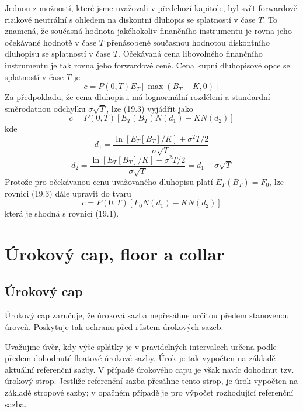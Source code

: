 \documentclass[a4paper]{book}
\begin{document}
Jednou z možností, které jsme uvažovali v předchozí kapitole, byl svět forwardově rizikově neutrální s ohledem na diskontní dluhopis se splatností v čase $T$. To znamená, že současná hodnota jakéhokoliv finančního instrumentu je rovna jeho očekávané hodnotě v čase $T$ přenásobené současnou hodnotou diskontního dluhopisu se splatností v čase $T$. Očekávaná cena libovolného finančního instrumentu je tak rovna jeho forwardové ceně. Cena kupní dluhopisové opce se splatností v čase $T$ je
\begin{equation}
c = P(0,T)E_T[\max(B_T - K, 0)]
\end{equation}
Za předpokladu, že cena dluhopisu má lognormální rozdělení a standardní směrodatnou odchylku $\sigma \sqrt{T}$, lze (19.3) vyjádřit jako
\begin{equation*}
c = P(0,T)[E_T(B_T)N(d_1)-KN(d_2)]
\end{equation*}
kde
\begin{equation*}
d_1 = \frac{\ln[E_T[B_T]/K]+\sigma^2T/2}{\sigma \sqrt{T}}
\end{equation*}
\begin{equation*}
d_2 = \frac{\ln[E_T[B_T]/K]-\sigma^2T/2}{\sigma \sqrt{T}} = d_1 - \sigma \sqrt{T}
\end{equation*}
Protože pro očekávanou cenu uvažovaného dluhopisu platí $E_T(B_T) = F_0$, lze rovnici (19.3) dále upravit do tvaru
\begin{equation*}
c = P(0,T)[F_0N(d_1)-KN(d_2)]
\end{equation*}
která je shodná s rovnicí (19.1).

\section{Úrokový cap, floor a collar}

\subsection{Úrokový cap}

Úrokový cap zaručuje, že úroková sazba nepřesáhne určitou předem stanovenou úroveň. Poskytuje tak ochranu před růstem úrokových sazeb.

Uvažujme úvěr, kdy výše splátky je v pravidelných intervalech určena podle předem dohodnuté floatové úrokové sazby. Úrok je tak vypočten na základě aktuální referenční sazby. V případě úrokového capu je však navíc dohodnut tzv. úrokový strop. Jestliže referenční sazba přesáhne tento strop, je úrok vypočten na základě stropové sazby; v opačném případě je pro výpočet rozhodující referenční sazba.\\
\end{document}
